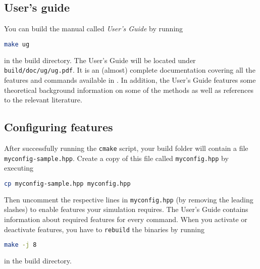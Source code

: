 \documentclass[
paper=a4,                       %
fontsize=11pt,                  %
headinclude=false,              %
footinclude=false,              %
pagesize,                       %
]{scrartcl}
\begin{document}
\subsection{User's guide}
You can build the \es{} manual called \emph{\es{} User's Guide} by running
\begin{lstlisting}[language=bash]
make ug
\end{lstlisting}
in the build directory. The User's Guide will be located under \texttt{build/doc/ug/ug.pdf}. It is an (almost) complete documentation covering all the features and commands available in \es{}. In addition, the User's Guide features some theoretical background information on some of the methods as well as references to the relevant literature.

\subsection{Configuring features}
%
After successfully running the \verb!cmake! script, your build folder will contain a file \\ \texttt{myconfig-sample.hpp}. Create a copy of this file called \texttt{myconfig.hpp} by executing
\begin{lstlisting}[language=bash]
cp myconfig-sample.hpp myconfig.hpp
\end{lstlisting}
%
Then uncomment the respective lines in \texttt{myconfig.hpp} (by removing the leading slashes) to enable features your simulation requires. The User's Guide contains information about required features for every \es{} command.
When you activate or deactivate features, you have to \verb!rebuild! the binaries by running
%
\begin{lstlisting}[language=bash]
make -j 8
\end{lstlisting}
%
in the build directory.
\end{document}

